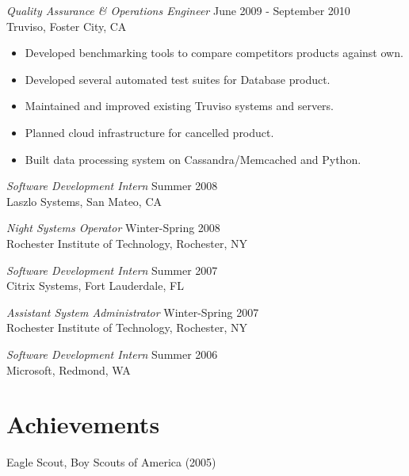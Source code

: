 \documentclass[line,margin]{res}
\begin{document}
\begin{resume}
                {\sl Quality Assurance \& Operations Engineer} \hfill June 2009 - September 2010 \\
                Truviso, Foster City, CA
                \begin{itemize}  \itemsep -2pt %
                 \item Developed benchmarking tools to compare competitors products against own.
                 \item Developed several automated test suites for Database product.
                 \item Maintained and improved existing Truviso systems and servers.
                 \item Planned cloud infrastructure for cancelled product.
                 \item Built data processing system on Cassandra/Memcached and Python.
                \end{itemize}
                
                {\sl Software Development Intern} \hfill        Summer 2008 \\
                Laszlo Systems, San Mateo, CA
                
                {\sl Night Systems Operator} \hfill        Winter-Spring 2008 \\
                Rochester Institute of Technology, Rochester, NY
                
                {\sl Software Development Intern} \hfill        Summer 2007 \\
                Citrix Systems, Fort Lauderdale, FL
                
                {\sl Assistant System Administrator} \hfill        Winter-Spring 2007 \\
                Rochester Institute of Technology,  Rochester, NY
                
                {\sl Software Development Intern} \hfill          Summer 2006 \\
                Microsoft, Redmond, WA
           
\section{Achievements}             
            Eagle Scout, Boy Scouts of America (2005) \\
 
\end{resume}
\end{document}

